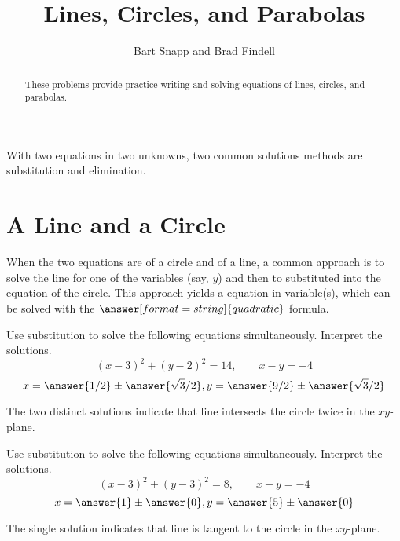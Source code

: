 \documentclass[nooutcomes]{ximera}
\title{Lines, Circles, and Parabolas}
\author{Bart Snapp and Brad Findell}
\begin{document}
\begin{abstract}
These problems provide practice writing and solving equations of lines, circles, and parabolas. 
\end{abstract}
\maketitle


%
%
%
%
%
%

With two equations in two unknowns, two common solutions methods are substitution and elimination.  

\section{A Line and a Circle}

When the two equations are of a circle and of a line, a common approach is to solve the line for one of the variables (say, $y$) and then to substituted into the equation of the circle.  This approach yields a  equation in  variable(s), which can be solved with the $\answer[format=string]{quadratic}$ formula.  

\begin{problem}
Use substitution to solve the following equations simultaneously.  Interpret the solutions.  
\[
(x-3)^2+(y-2)^2 = 14, \qquad  x - y = -4
\]
\[
x  = \answer{1/2} \pm \answer{\sqrt{3}/2}, y = \answer{9/2} \pm \answer{\sqrt{3}/2}
\]
\begin{hint}
The two distinct solutions indicate that line intersects the circle twice in the $xy$-plane.  
\end{hint}
\end{problem}


\begin{problem}
Use substitution to solve the following equations simultaneously.  Interpret the solutions.  
\[
(x-3)^2+(y-3)^2 = 8, \qquad x - y = -4
\]
\[
x  = \answer{1} \pm \answer{0}, y = \answer{5} \pm \answer{0}
\]
\begin{hint}
The single solution indicates that line is tangent to the circle in the $xy$-plane.  
\end{hint}
\end{problem}
\end{document}
